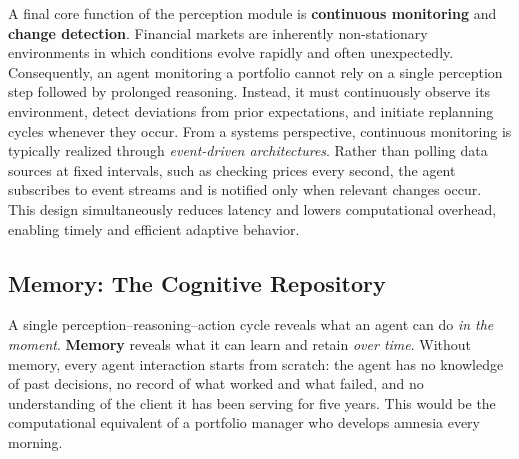 \documentclass{article}
\begin{document}
A final core function of the perception module is \textbf{continuous monitoring} and \textbf{change detection}. Financial markets are inherently non-stationary environments in which conditions evolve rapidly and often unexpectedly. Consequently, an agent monitoring a portfolio cannot rely on a single perception step followed by prolonged reasoning. Instead, it must continuously observe its environment, detect deviations from prior expectations, and initiate replanning cycles whenever they occur. From a systems perspective, continuous monitoring is typically realized through \textit{event-driven architectures}. Rather than polling data sources at fixed intervals, such as checking prices every second, the agent subscribes to event streams and is notified only when relevant changes occur. This design simultaneously reduces latency and lowers computational overhead, enabling timely and efficient adaptive behavior.


\subsection{Memory: The Cognitive Repository}
\label{subsec:memory}
A single perception--reasoning--action cycle reveals what an agent can do \textit{in the moment}. \textbf{Memory} reveals what it can learn and retain \textit{over time}. Without memory, every agent interaction starts from scratch: the agent has no knowledge of past decisions, no record of what worked and what failed, and no understanding of the client it has been serving for five years. This would be the computational equivalent of a portfolio manager who develops amnesia every morning.
\end{document}
